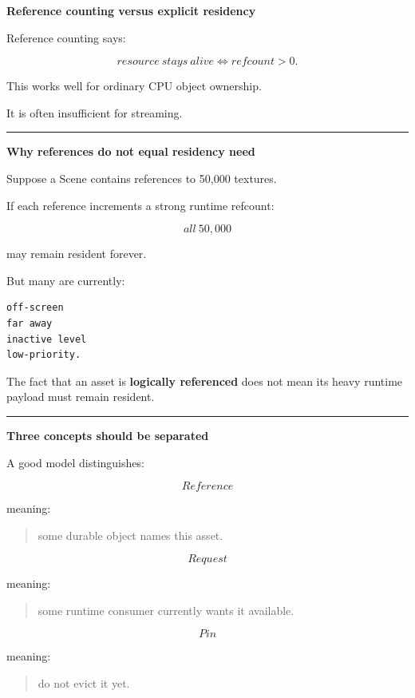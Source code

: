 \textbf{Reference counting versus explicit residency}

Reference counting says:

\[
resource\ stays\ alive
\iff
refcount>0.
\]

This works well for ordinary CPU object ownership.

It is often insufficient for streaming.

\begin{center}\rule{0.5\linewidth}{0.5pt}\end{center}

\textbf{Why references do not equal residency need}

Suppose a Scene contains references to 50,000 textures.

If each reference increments a strong runtime refcount:

\[
all\ 50,000
\]

may remain resident forever.

But many are currently:

\begin{verbatim}
off-screen
far away
inactive level
low-priority.
\end{verbatim}

The fact that an asset is \textbf{logically referenced} does not mean its heavy runtime payload must remain resident.

\begin{center}\rule{0.5\linewidth}{0.5pt}\end{center}

\textbf{Three concepts should be separated}

A good model distinguishes:

\[
\boxed{
Reference
}
\]

meaning:

\begin{quote}
some durable object names this asset.
\end{quote}

\[
\boxed{
Request
}
\]

meaning:

\begin{quote}
some runtime consumer currently wants it available.
\end{quote}

\[
\boxed{
Pin
}
\]

meaning:

\begin{quote}
do not evict it yet.
\end{quote}


